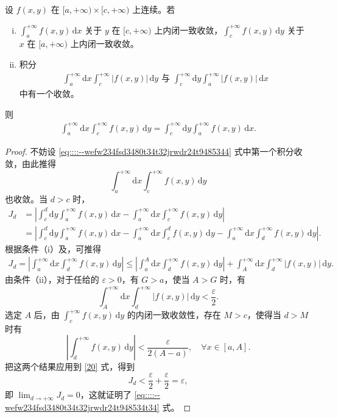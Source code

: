 \documentclass[../../main.tex]{subfiles}%
\begin{document}
\begin{theorem}\label{theorem:含参积分可积性定理}
设 \( f(x,y) \) 在 \( [a, +\infty) \times [c, +\infty) \) 上连续。若
\begin{enumerate}[(i)]
\item \( \int_{a}^{+\infty} f(x,y) \, \mathrm{d}x \) 关于 \( y \) 在 \( [c, +\infty) \) 上内闭一致收敛，\( \int_{c}^{+\infty} f(x,y) \, \mathrm{d}y \) 关于 \( x \) 在 \( [a, +\infty) \) 上内闭一致收敛。

\item 积分
\begin{align}\label{eq::::--wefw234fsd3480t34t32jrwdr24t9485344}
\int_{a}^{+\infty} \mathrm{d}x \int_{c}^{+\infty} |f(x,y)| \, \mathrm{d}y \text{ 与 } \int_{c}^{+\infty} \mathrm{d}y \int_{a}^{+\infty} |f(x,y)| \, \mathrm{d}x
\end{align}
中有一个收敛。
\end{enumerate}
则
\begin{align}\label{eq::::--wefw234fsd3480t34t32jrwdr24t948534t34}
\int_{a}^{+\infty} \mathrm{d}x \int_{c}^{+\infty} f(x,y) \, \mathrm{d}y = \int_{c}^{+\infty} \mathrm{d}y \int_{a}^{+\infty} f(x,y) \, \mathrm{d}x.
\end{align}
\end{theorem}
\begin{proof}
不妨设 \eqref{eq::::--wefw234fsd3480t34t32jrwdr24t9485344} 式中第一个积分收敛，由此推得
\[
\int_{a}^{+\infty} \mathrm{d}x \int_{c}^{+\infty} f(x,y) \, \mathrm{d}y
\]
也收敛。当 \( d > c \) 时，
\begin{align*}
J_d &= \left| \int_{c}^{d} \mathrm{d}y \int_{a}^{+\infty} f(x,y) \, \mathrm{d}x - \int_{a}^{+\infty} \mathrm{d}x \int_{c}^{+\infty} f(x,y) \, \mathrm{d}y \right| \\
&= \left| \int_{c}^{d} \mathrm{d}y \int_{a}^{+\infty} f(x,y) \, \mathrm{d}x - \int_{a}^{+\infty} \mathrm{d}x \int_{c}^{d} f(x,y) \, \mathrm{d}y - \int_{a}^{+\infty} \mathrm{d}x \int_{d}^{+\infty} f(x,y) \, \mathrm{d}y \right|.
\end{align*}
根据条件（i）及，可推得
\begin{align}\label{20}
J_d = \left| \int_{a}^{+\infty} \mathrm{d}x \int_{d}^{+\infty} f(x,y) \, \mathrm{d}y \right| \leqslant \left| \int_{a}^{A} \mathrm{d}x \int_{d}^{+\infty} f(x,y) \, \mathrm{d}y \right| + \int_{A}^{+\infty} \mathrm{d}x \int_{d}^{+\infty} |f(x,y)| \, \mathrm{d}y.
\end{align}
由条件（ii），对于任给的 \( \varepsilon > 0 \)，有 \( G > a \)，使当 \( A > G \) 时，有
\[
\int_{A}^{+\infty} \mathrm{d}x \int_{d}^{+\infty} |f(x,y)| \, \mathrm{d}y < \frac{\varepsilon}{2}.
\]
选定 \( A \) 后，由 \( \int_{c}^{+\infty} f(x,y) \, \mathrm{d}y \) 的内闭一致收敛性，存在 \( M > c \)，使得当 \( d > M \) 时有
\[
\left| \int_{d}^{+\infty} f(x,y) \, \mathrm{d}y \right| < \frac{\varepsilon}{2(A - a)}, \quad \forall x \in [a,A].
\]
把这两个结果应用到 \eqref{20} 式，得到
\[
J_d < \frac{\varepsilon}{2} + \frac{\varepsilon}{2} = \varepsilon,
\]
即 \( \lim_{d \to +\infty} J_d = 0 \)，这就证明了 \eqref{eq::::--wefw234fsd3480t34t32jrwdr24t948534t34} 式。
\end{proof}
\end{document}
